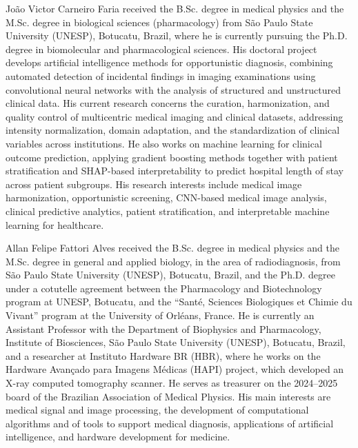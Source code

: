 \documentclass{ieeeaccess}
\begin{document}
\begin{IEEEbiographynophoto}{Jo\~ao Victor Carneiro Faria}
received the B.Sc. degree in medical physics and the M.Sc. degree in biological sciences (pharmacology) from S\~ao Paulo State University (UNESP), Botucatu, Brazil, where he is currently pursuing the Ph.D. degree in biomolecular and pharmacological sciences. His doctoral project develops artificial intelligence methods for opportunistic diagnosis, combining automated detection of incidental findings in imaging examinations using convolutional neural networks with the analysis of structured and unstructured clinical data. His current research concerns the curation, harmonization, and quality control of multicentric medical imaging and clinical datasets, addressing intensity normalization, domain adaptation, and the standardization of clinical variables across institutions. He also works on machine learning for clinical outcome prediction, applying gradient boosting methods together with patient stratification and SHAP-based interpretability to predict hospital length of stay across patient subgroups. His research interests include medical image harmonization, opportunistic screening, CNN-based medical image analysis, clinical predictive analytics, patient stratification, and interpretable machine learning for healthcare.
\end{IEEEbiographynophoto}
\begin{IEEEbiographynophoto}{Allan Felipe Fattori Alves}
received the B.Sc. degree in medical physics and the M.Sc. degree in general and applied biology, in the area of radiodiagnosis, from S\~ao Paulo State University (UNESP), Botucatu, Brazil, and the Ph.D. degree under a cotutelle agreement between the Pharmacology and Biotechnology program at UNESP, Botucatu, and the ``Sant\'e, Sciences Biologiques et Chimie du Vivant'' program at the University of Orl\'eans, France. He is currently an Assistant Professor with the Department of Biophysics and Pharmacology, Institute of Biosciences, S\~ao Paulo State University (UNESP), Botucatu, Brazil, and a researcher at Instituto Hardware BR (HBR), where he works on the Hardware Avan\c{c}ado para Imagens M\'edicas (HAPI) project, which developed an X-ray computed tomography scanner. He serves as treasurer on the 2024--2025 board of the Brazilian Association of Medical Physics. His main interests are medical signal and image processing, the development of computational algorithms and of tools to support medical diagnosis, applications of artificial intelligence, and hardware development for medicine.
\end{IEEEbiographynophoto}

\EOD
\end{document}
